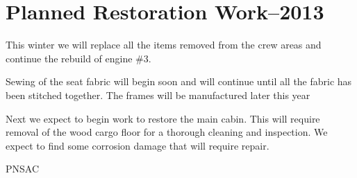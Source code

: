\section{Planned Restoration Work--2013}
\label{sec:plannedwork}

This winter we will replace all the items removed from the crew areas
and continue the rebuild of engine \#3.

Sewing of the seat fabric will begin soon and will continue until all
the fabric has been stitched together.  The frames will be
manufactured later this year

Next we expect to begin work to restore the main cabin.  This will
require removal of the wood cargo floor for a thorough cleaning and
inspection.  We expect to find some corrosion damage that will require
repair. 



\begin{footnotesize}
  \raggedleft PNSAC\\
\end{footnotesize}



